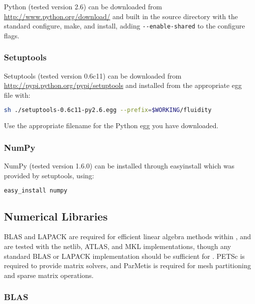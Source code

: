 Python (tested version 2.6) can be downloaded from
\url{http://www.python.org/download/} and built in the source directory with
the standard configure, make, and install, adding
\lstinline[language=bash]+--enable-shared+ to the configure flags.

\subsubsection{Setuptools}
\label{sec:required_libraries_python_setuptools}

Setuptools (tested version 0.6c11) can be downloaded from
\url{http://pypi.python.org/pypi/setuptools} and installed from the appropriate
egg file with:

\begin{lstlisting}[language=bash]
sh ./setuptools-0.6c11-py2.6.egg --prefix=$WORKING/fluidity
\end{lstlisting}

Use the appropriate filename for the Python egg you have downloaded.

\subsubsection{NumPy}
\label{sec:required_libraries_python_numpy}

NumPy (tested version 1.6.0) can be installed through
easy{\textunderscore}install which was provided by setuptools, using:

\begin{lstlisting}[language=bash]
easy_install numpy
\end{lstlisting}

\subsection{Numerical Libraries}
\label{sec:required_libraries_numerical}

BLAS and LAPACK are required for efficient linear algebra methods within
\fluidity, and are tested with the netlib, ATLAS, and MKL implementations, though
any standard BLAS or LAPACK implementation should be sufficient for \fluidity.
PETSc is required to provide matrix solvers, and ParMetis is required for mesh
partitioning and sparse matrix operations.

\subsubsection{BLAS}
\label{sec:required_libraries_numerical_blas}

